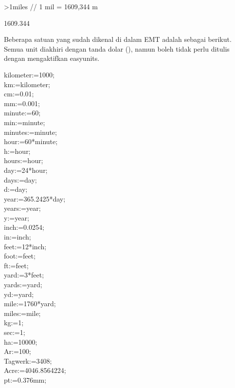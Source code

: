 \documentclass{article}
\begin{document}
\begin{eulernotebook}
\begin{eulercomment}
\begin{eulercomment}
\begin{eulercomment}
\end{eulercomment}
\begin{eulerprompt}
>1miles  // 1 mil = 1609,344 m
\end{eulerprompt}
\begin{euleroutput}
  1609.344
\end{euleroutput}
\begin{eulercomment}
Beberapa satuan yang sudah dikenal di dalam EMT adalah sebagai
berikut. Semua unit diakhiri dengan tanda dolar (\textdollar{}), namun boleh tidak
perlu ditulis dengan mengaktifkan easyunits.

kilometer\textdollar{}:=1000;\\
km\textdollar{}:=kilometer\textdollar{};\\
cm\textdollar{}:=0.01;\\
mm\textdollar{}:=0.001;\\
minute\textdollar{}:=60;\\
min\textdollar{}:=minute\textdollar{};\\
minutes\textdollar{}:=minute\textdollar{};\\
hour\textdollar{}:=60*minute\textdollar{};\\
h\textdollar{}:=hour\textdollar{};\\
hours\textdollar{}:=hour\textdollar{};\\
day\textdollar{}:=24*hour\textdollar{};\\
days\textdollar{}:=day\textdollar{};\\
d\textdollar{}:=day\textdollar{};\\
year\textdollar{}:=365.2425*day\textdollar{};\\
years\textdollar{}:=year\textdollar{};\\
y\textdollar{}:=year\textdollar{};\\
inch\textdollar{}:=0.0254;\\
in\textdollar{}:=inch\textdollar{};\\
feet\textdollar{}:=12*inch\textdollar{};\\
foot\textdollar{}:=feet\textdollar{};\\
ft\textdollar{}:=feet\textdollar{};\\
yard\textdollar{}:=3*feet\textdollar{};\\
yards\textdollar{}:=yard\textdollar{};\\
yd\textdollar{}:=yard\textdollar{};\\
mile\textdollar{}:=1760*yard\textdollar{};\\
miles\textdollar{}:=mile\textdollar{};\\
kg\textdollar{}:=1;\\
sec\textdollar{}:=1;\\
ha\textdollar{}:=10000;\\
Ar\textdollar{}:=100;\\
Tagwerk\textdollar{}:=3408;\\
Acre\textdollar{}:=4046.8564224;\\
pt\textdollar{}:=0.376mm;


\end{eulercomment}
\end{eulercomment}
\end{eulercomment}
\end{eulernotebook}
\end{document}
